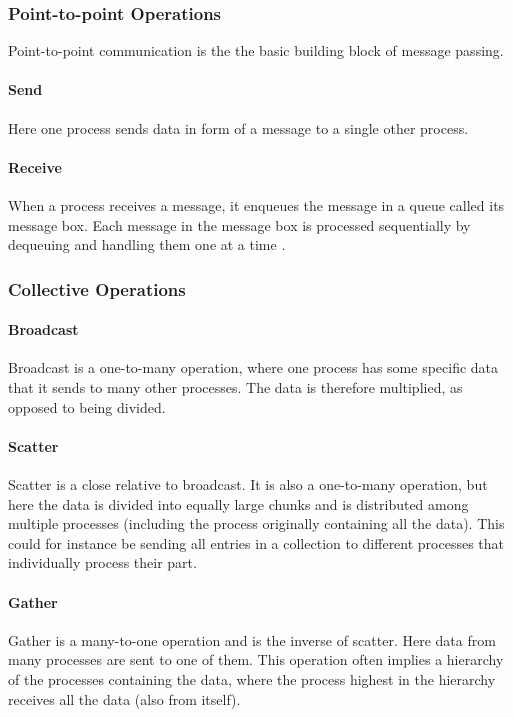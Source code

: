\subsubsection{Point-to-point Operations}
Point-to-point communication is the the basic building block of message passing.
\paragraph{Send}
Here one process sends data in form of a message to a single other process.
\paragraph{Receive}
When a process receives a message, it enqueues the message in a queue called its message box. Each message in the message box is processed sequentially by dequeuing and handling them one at a time \cite{mpi1}.

\subsubsection{Collective Operations}
\paragraph{Broadcast}
Broadcast is a one-to-many operation, where one process has some specific data that it sends to many other processes. The data is therefore multiplied, as opposed to being divided.

\paragraph{Scatter}
Scatter is a close relative to broadcast. It is also a one-to-many operation, but here the data is divided into equally large chunks and is distributed among multiple processes (including the process originally containing all the data). This could for instance be sending all entries in a collection to different processes that individually process their part.

\paragraph{Gather}
Gather is a many-to-one operation and is the inverse of scatter. Here data from many processes are sent to one of them. This operation often implies a hierarchy of the processes containing the data, where the process highest in the hierarchy receives all the data (also from itself).

